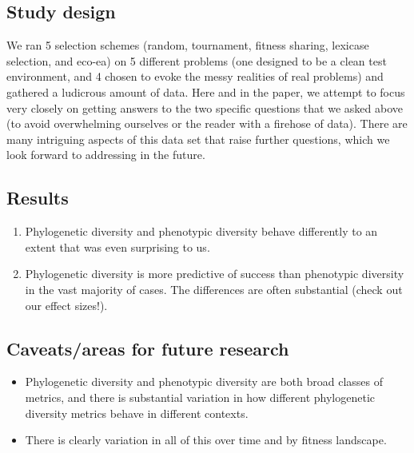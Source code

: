 \documentclass[]{book}
\begin{document}
\hypertarget{study-design}{%
\subsection{Study design}\label{study-design}}

We ran 5 selection schemes (random, tournament, fitness sharing, lexicase selection, and eco-ea) on 5 different problems (one designed to be a clean test environment, and 4 chosen to evoke the messy realities of real problems) and gathered a ludicrous amount of data. Here and in the paper, we attempt to focus very closely on getting answers to the two specific questions that we asked above (to avoid overwhelming ourselves or the reader with a firehose of data). There are many intriguing aspects of this data set that raise further questions, which we look forward to addressing in the future.

\hypertarget{results}{%
\subsection{Results}\label{results}}

\begin{enumerate}
\def\labelenumi{\arabic{enumi}.}
\item
  Phylogenetic diversity and phenotypic diversity behave differently to an extent that was even surprising to us.
\item
  Phylogenetic diversity is more predictive of success than phenotypic diversity in the vast majority of cases. The differences are often substantial (check out our effect sizes!).
\end{enumerate}

\hypertarget{caveatsareas-for-future-research}{%
\subsection{Caveats/areas for future research}\label{caveatsareas-for-future-research}}

\begin{itemize}
\item
  Phylogenetic diversity and phenotypic diversity are both broad classes of metrics, and there is substantial variation in how different phylogenetic diversity metrics behave in different contexts.
\item
  There is clearly variation in all of this over time and by fitness landscape.
\end{itemize}
\end{document}
